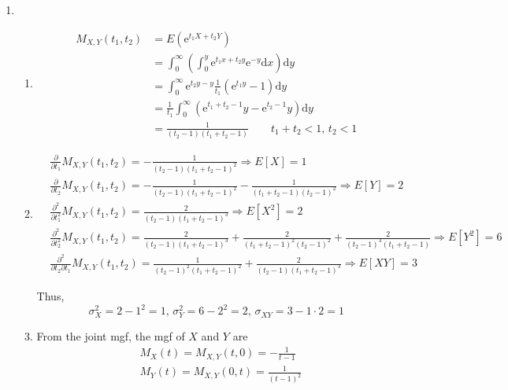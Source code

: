 \documentclass{article}
\begin{document}
\begin{enumerate}[leftmargin = 0 em, label = \arabic*., font = \bfseries]
	\item 
	\begin{enumerate}
		\item 
		\begin{align*}
		M_{X, Y}(t_1 , t_2) & = E(\mathrm{e}^{t_1 X + t_2 Y} )\\
		& = \int_{0}^{\infty} \left(\int_{0}^{y} \mathrm{e}^{t_1 x + t_2 y} \mathrm{e}^{-y} \mathrm{d}x\right)\mathrm{d}y\\
		& = \int_{0}^{\infty} \mathrm{e}^{t_2 y - y} \frac{1}{t_1} (\mathrm{e}^{t_1 y} - 1) \mathrm{d}y\\
		 & = \frac{1}{t_1} \int_{0}^\infty (\mathrm{e}^{t_1 + t_2 -1}y - \mathrm{e}^{t_2 - 1}y) \mathrm{d}y\\
		& = \frac{1}{(t_2 -1)(t_1 + t_2 -1)}\qquad t_1 + t_2 < 1,\, t_2 < 1
		\end{align*}

		\item 
		\begin{align*}
		&\frac{\partial}{\partial t_1 }M_{X, Y}(t_1 , t_2) = - \frac{1}{(t_2 - 1)(t_1 + t_2 -1)^2} \Rightarrow E[X] = 1 \\
		&\frac{\partial}{\partial t_2}M_{X, Y}(t_1 , t_2) = - \frac{1}{(t_2 - 1)(t_1 + t_2 -1)^2} - \frac{1}{(t_1 + t_2 -1)(t_2 - 1)^2} \Rightarrow E[Y] = 2 \\
		&\frac{\partial^2}{\partial t_1^2} M_{X,Y}(t_1, t_2) = \frac{2}{(t_2 - 1)(t_1 + t_2 -1)^3} \Rightarrow E[X^2] = 2\\
		&\frac{\partial^2}{\partial t_2^2} M_{X,Y}(t_1, t_2) = \frac{2}{(t_2 - 1)(t_1 + t_2 -1)^3}  + \frac{2}{(t_1 + t_2 - 1)^2 (t_2 - 1)^2} + \frac{2}{(t_2 - 1)^3 (t_1 + t_2 - 1)} \Rightarrow E[Y^2] = 6\\
		& \frac{\partial^2}{\partial t_2 \partial t_1} M_{X,Y}(t_1 , t_2) = \frac{1}{(t_2 - 1)^2 (t_1 + t_2 -1)^2} + \frac{2}{(t_2 - 1)(t_1 + t_2 - 1)^3} \Rightarrow E[XY] = 3
		\end{align*}

		Thus,
		\[\sigma_X^2 = 2 - 1^2 = 1,\, \sigma_Y^2 = 6 - 2^2 = 2,\, \sigma_{XY} = 3 - 1 \cdot 2 = 1\]

		\item 
		From the joint mgf, the mgf of $X$ and $Y$ are 
		\begin{align*}
		& M_X (t) = M_{X,Y}(t, 0) = -\frac{1}{t - 1}\\
		& M_Y (t) = M_{X,Y}(0, t) = \frac{1}{(t - 1)^2}
		\end{align*}


\end{enumerate}
\end{enumerate}
\end{document}
